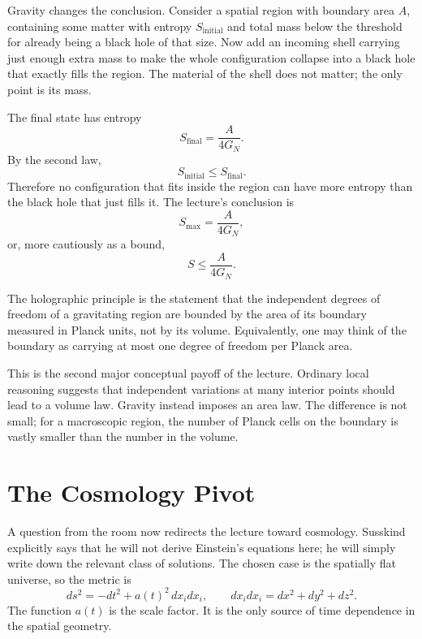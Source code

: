 Gravity changes the conclusion. Consider a spatial region with boundary area \(A\), containing some matter with entropy \(S_{\mathrm{initial}}\) and total mass below the threshold for already being a black hole of that size. Now add an incoming shell carrying just enough extra mass to make the whole configuration collapse into a black hole that exactly fills the region. The material of the shell does not matter; the only point is its mass.

The final state has entropy
\begin{equation}
S_{\mathrm{final}}=\frac{A}{4G_N}.
\end{equation}
By the second law,
\begin{equation}
S_{\mathrm{initial}} \le S_{\mathrm{final}}.
\end{equation}
Therefore no configuration that fits inside the region can have more entropy than the black hole that just fills it. The lecture's conclusion is
\begin{equation}
S_{\max}=\frac{A}{4G_N},
\end{equation}
or, more cautiously as a bound,
\begin{equation}
S \le \frac{A}{4G_N}.
\end{equation}

\begin{definition}
The holographic principle is the statement that the independent degrees of freedom of a gravitating region are bounded by the area of its boundary measured in Planck units, not by its volume. Equivalently, one may think of the boundary as carrying at most one degree of freedom per Planck area.
\end{definition}

This is the second major conceptual payoff of the lecture. Ordinary local reasoning suggests that independent variations at many interior points should lead to a volume law. Gravity instead imposes an area law. The difference is not small; for a macroscopic region, the number of Planck cells on the boundary is vastly smaller than the number in the volume.

\section{The Cosmology Pivot}

A question from the room now redirects the lecture toward cosmology. Susskind explicitly says that he will not derive Einstein's equations here; he will simply write down the relevant class of solutions. The chosen case is the spatially flat universe, so the metric is
\begin{equation}
ds^2=-dt^2+a(t)^2\,dx_i dx_i,
\qquad
dx_i dx_i = dx^2+dy^2+dz^2.
\end{equation}
The function \(a(t)\) is the scale factor. It is the only source of time dependence in the spatial geometry.

